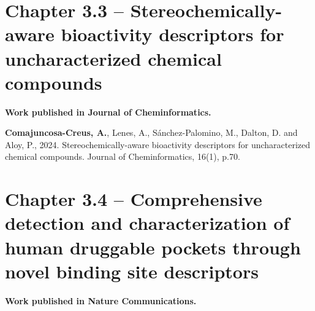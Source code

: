 




\newpage



\section[Stereochemically-aware bioactivity descriptors for uncharacterized chemical compounds]{Chapter 3.3 -- Stereochemically-aware bioactivity descriptors for uncharacterized chemical compounds}
\label{Chapter_3.3}
\setcounter{figure}{0}
\renewcommand{\thefigure}{3.\arabic{section}.\arabic{figure}}

\textbf{Work published in Journal of Cheminformatics.}

\textbf{Comajuncosa-Creus, A.}, Lenes, A., Sánchez-Palomino, M., Dalton, D. and Aloy,
P., 2024. Stereochemically-aware bioactivity descriptors for uncharacterized chemical
compounds. Journal of Cheminformatics, 16(1), p.70.







\newpage




\section[Comprehensive detection and characterization of human druggable pockets through novel binding site descriptors]{Chapter 3.4 -- Comprehensive detection and characterization of human druggable pockets through novel binding site descriptors}
\label{Chapter_3.4}
\setcounter{figure}{0}
\renewcommand{\thefigure}{3.\arabic{section}.\arabic{figure}}
\textbf{Work published in Nature Communications.}

